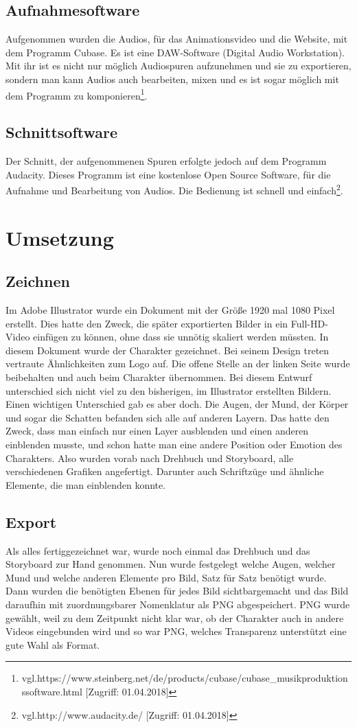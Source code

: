 \subsection{Aufnahmesoftware}
Aufgenommen wurden die Audios, für das Animationsvideo und die Website, mit dem Programm Cubase. Es ist eine DAW-Software (Digital Audio Workstation). Mit ihr ist es nicht nur möglich Audiospuren aufzunehmen und sie zu exportieren, sondern man kann Audios auch bearbeiten, mixen und es ist sogar möglich mit dem Programm zu komponieren\footnote{\label{} vgl.https://www.steinberg.net/de/products/cubase/cubase\_musikproduktionssoftware.html [Zugriff: 01.04.2018]}.
\subsection{Schnittsoftware}
Der Schnitt, der aufgenommenen Spuren erfolgte jedoch auf dem Programm Audacity. Dieses Programm ist eine kostenlose Open Source Software, für die Aufnahme und Bearbeitung von Audios. Die Bedienung ist schnell und einfach\footnote{\label{} vgl.http://www.audacity.de/ [Zugriff: 01.04.2018]}.

\section{Umsetzung}

\subsection{Zeichnen}
Im Adobe Illustrator wurde ein Dokument mit der Größe 1920 mal 1080 Pixel erstellt. Dies hatte den Zweck, die später exportierten Bilder in ein Full-HD-Video einfügen zu können, ohne dass sie unnötig skaliert werden müssten. In diesem Dokument wurde der Charakter gezeichnet. Bei seinem Design treten vertraute Ähnlichkeiten zum Logo auf. Die offene Stelle an der linken Seite wurde beibehalten und auch beim Charakter übernommen. Bei diesem Entwurf unterschied sich nicht viel zu den bisherigen, im Illustrator erstellten Bildern. Einen wichtigen Unterschied gab es aber doch. Die Augen, der Mund, der Körper und sogar die Schatten befanden sich alle auf anderen Layern. Das hatte den Zweck, dass man einfach nur einen Layer ausblenden und einen anderen einblenden musste, und schon hatte man eine andere Position oder Emotion des Charakters. Also wurden vorab nach Drehbuch und Storyboard, alle verschiedenen Grafiken angefertigt. Darunter auch Schriftzüge und ähnliche Elemente, die man einblenden konnte.
\subsection{Export}
Als alles fertiggezeichnet war, wurde noch einmal das Drehbuch und das Storyboard zur Hand genommen. Nun wurde festgelegt welche Augen, welcher Mund und welche anderen Elemente pro Bild, Satz für Satz benötigt wurde. Dann wurden die benötigten Ebenen für jedes Bild sichtbargemacht und das Bild daraufhin mit zuordnungsbarer Nomenklatur als PNG abgespeichert. PNG wurde gewählt, weil zu dem Zeitpunkt nicht klar war, ob der Charakter auch in andere Videos eingebunden wird und so war PNG, welches Transparenz unterstützt eine gute Wahl als Format.
